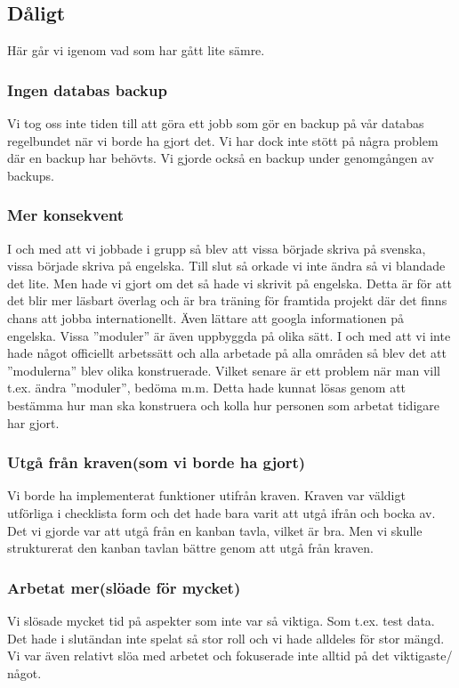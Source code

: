 \documentclass[11pt]{article}					%
\begin{document}
\subsection*{Dåligt}
Här går vi igenom vad som har gått lite sämre.
\subsubsection*{Ingen databas backup}
Vi tog oss inte tiden till att göra ett jobb som gör en backup på vår databas regelbundet när vi borde ha gjort det. Vi har dock inte stött på några problem där en backup har behövts. Vi gjorde också en backup under genomgången av backups.
\subsubsection*{Mer konsekvent}
I och med att vi jobbade i grupp så blev att vissa började skriva på svenska, vissa började skriva på engelska. Till slut så orkade vi inte ändra så vi blandade det lite. Men hade vi gjort om det så hade vi skrivit på engelska. Detta är för att det blir mer läsbart överlag och är bra träning för framtida projekt där det finns chans att jobba internationellt. Även lättare att googla informationen på engelska. Vissa ”moduler” är även uppbyggda på olika sätt. I och med att vi inte hade något officiellt arbetssätt och alla arbetade på alla områden så blev det att ”modulerna” blev olika konstruerade. Vilket senare är ett problem när man vill t.ex. ändra ”moduler”, bedöma m.m. Detta hade kunnat lösas genom att bestämma hur man ska konstruera och kolla hur personen som arbetat tidigare har gjort.
\subsubsection*{Utgå från kraven(som vi borde ha gjort)}
Vi borde ha implementerat funktioner utifrån kraven. Kraven var väldigt utförliga i checklista form och det hade bara varit att utgå ifrån och bocka av. Det vi gjorde var att utgå från en kanban tavla, vilket är bra. Men vi skulle strukturerat den kanban tavlan bättre genom att utgå från kraven.
\subsubsection*{Arbetat mer(slöade för mycket)}
Vi slösade mycket tid på aspekter som inte var så viktiga. Som t.ex. test data. Det hade i slutändan inte spelat så stor roll och vi hade alldeles för stor mängd. Vi var även relativt slöa med arbetet och fokuserade inte alltid på det viktigaste/ något.
\end{document}
